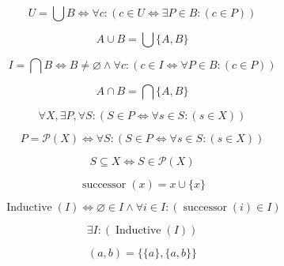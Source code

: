 \documentclass{main}
\begin{document}
\begin{definition}[Union]
$$
	U=\bigcup B
	\Leftrightarrow
	\forall c:(
		c\in U
		\Leftrightarrow
		\exists P\in B:(
			c\in P
		)
	)
$$
\end{definition}

\begin{definition}
$$
	A\cup B
	=
	\bigcup\{A,B\}
$$
\end{definition}

\begin{definition}[Intersection]
$$
	I=\bigcap B
	\Leftrightarrow
	B\neq\varnothing
	\land
	\forall c:(
		c\in I
		\Leftrightarrow
		\forall P\in B:(
			c\in P
		)
	)
$$
\end{definition}

\begin{definition}
$$
	A\cap B
	=
	\bigcap\{A,B\}
$$
\end{definition}

\begin{axiom}
$$
	\forall X,
	\exists P,
	\forall S:(
		S\in P
		\Leftrightarrow
		\forall s\in S:(
			s\in X
		)
	)
$$
\end{axiom}

\begin{definition}
$$
	P=\mathcal{P}(X)
	\Leftrightarrow
	\forall S:(
		S\in P
		\Leftrightarrow
		\forall s\in S:(
			s\in X
		)
	)
$$
\end{definition}

\begin{definition}[Subset]
$$
	S\subseteq X
	\Leftrightarrow
	S\in\mathcal{P}(X)
$$
\end{definition}

\begin{definition}[Successor]
$$
	\operatorname{successor}(x)
	=
	x\cup\{x\}
$$
\end{definition}

\begin{definition}
$$
	\operatorname{Inductive}(I)
	\Leftrightarrow
	\varnothing\in I
	\land
	\forall i\in I:(
		\operatorname{successor}(i)\in I
	)
$$
\end{definition}

\begin{axiom}[Infinity]
$$
	\exists I:(
		\operatorname{Inductive}(I)
	)
$$
\end{axiom}

\begin{definition}[Pair]
$$
	(a,b)
	=
	\{\{a\},\{a,b\}\}
$$
\end{definition}
\end{document}
